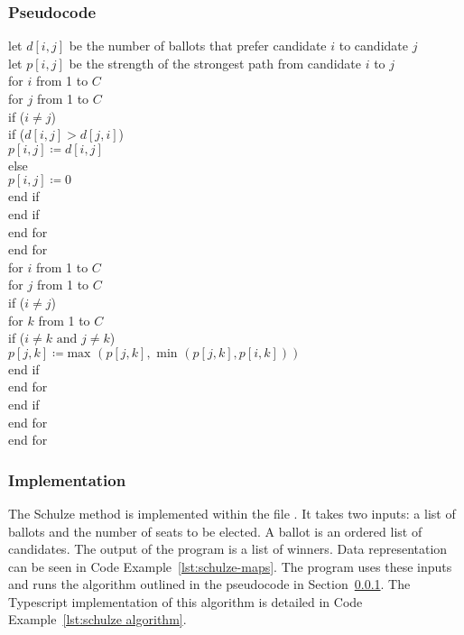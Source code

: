 \documentclass[12pt]{article}
\begin{document}
\subsubsection{Pseudocode}
\label{alg:schulze psuedocode}
let $d[i,j]$ be the number of ballots that prefer candidate $i$ to candidate $j$\\
let $p[i,j]$ be the strength of the strongest path from candidate $i$ to $j$\\
for $i$ from 1 to $C$\\
\tab for $j$ from 1 to $C$\\
\tab\tab if ($i \ne j$)\\
\tab\tab\tab if ($d[i,j] > d[j,i]$)\\
\tab\tab\tab\tab $p[i,j] \coloneqq d[i,j]$\\
\tab\tab\tab else\\
\tab\tab\tab\tab $p[i,j] \coloneqq 0$\\
\tab\tab\tab end if \\
\tab\tab end if \\
\tab end for \\
end for\\
for $i$ from 1 to $C$\\
\tab for $j$ from 1 to $C$\\
\tab\tab if ($i \ne j$)\\
\tab\tab\tab for $k$ from 1 to $C$\\
\tab\tab\tab\tab if ($i \ne k \text{ and } j \ne k$)\\
\tab\tab\tab\tab\tab $p[j,k] \coloneqq \text{max }(p[j,k], \text{ min }(p[j,k], p[i,k]))$\\
\tab\tab\tab\tab end if \\
\tab\tab\tab end for \\
\tab\tab end if \\
\tab end for \\
end for\\
\subsubsection{Implementation}
The Schulze method is implemented within the file . It takes two inputs: a list of ballots and the number of seats to be elected. A ballot is an ordered list of candidates. The output of the program is a list of winners. Data representation can be seen in Code Example~\ref{lst:schulze-maps}.
The program uses these inputs and runs the algorithm outlined in the pseudocode in Section~\ref{alg:schulze psuedocode}. The Typescript implementation of this algorithm is detailed in Code Example~\ref{lst:schulze algorithm}.
\end{document}
